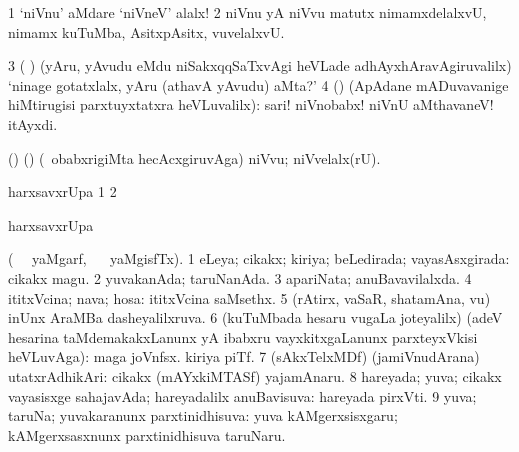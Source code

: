 \noindent
\gl{\pagu} 
\bmng
\bnum
\num{1}  `niVnu' aMdare `niVneV' alalx! 
\num{2}  niVnu yA niVvu matutx nimamxdelalxvU, nimamx kuTuMba, AsitxpAsitx, \mo vuvelalxvU. 
\num{3}  ( ) (yAru, yAvudu eMdu niSakxqqSaTxvAgi heVLade adhAyxhAravAgiruvalilx) `ninage gotatxlalx, yAru (athavA yAvudu) aMta?' 
\num{4}  (\AmA) (ApAdane mADuvavanige hiMtirugisi parxtuyxtatxra heVLuvalilx): sari! niVnobabx! niVnU aMthavaneV! itAyxdi.
\enum
\emng
\eentry

\bentry
{} 
\gl{\sanA} 
\bmng
(\ame) (\AmA) (\sA\ obabxrigiMta hecAcxgiruvAga) niVvu; niVvelalx(rU).
\emng
\eentry

\bentry
{} 
\gl{}
\bmng
harxsavxrUpa 
\bnum
\num{1}  
\num{2} 
\enum
\emng
\eentry

\bentry
{} 
\gl{}
\bmng
harxsavxrUpa 
\emng 
\eentry

\bentry
{} 
\gl{\gu} 
\bmng
(\tara\  \ucAcx\ yaMgarf, \tama\  \ucAcx\ yaMgisfTx). 
\bnum
\num{1} eLeya; cikakx; kiriya; beLedirada; vayasAsxgirada:  cikakx magu. 
\num{2} yuvakanAda; taruNanAda. 
\num{3} apariNata; anuBavavilalxda. 
\num{4} ititxVcina; nava; hosa:  ititxVcina saMsethx. 
\num{5} (rAtirx, vaSaR, shatamAna, \mo vu) inUnx AraMBa dasheyalilxruva. 
\num{6} (kuTuMbada hesaru \mo vugaLa joteyalilx) (adeV hesarina taMdemakakxLanunx yA ibabxru vayxkitxgaLanunx parxteyxVkisi heVLuvAga):  maga joVnfsx.   kiriya piTf. 
\num{7} (sAkxTelxMDf) (jamiVnudArana) utatxrAdhikAri:  cikakx (mAYxkiMTASf) yajamAnaru. 
\num{8} hareyada; yuva; cikakx vayasisxge sahajavAda; hareyadalilx anuBavisuva:  hareyada pirxVti. 
\num{9}  yuva; taruNa; yuvakaranunx parxtinidhisuva:   yuva kAMgerxsisxgaru; kAMgerxsasxnunx parxtinidhisuva taruNaru.
\enum
\emng

